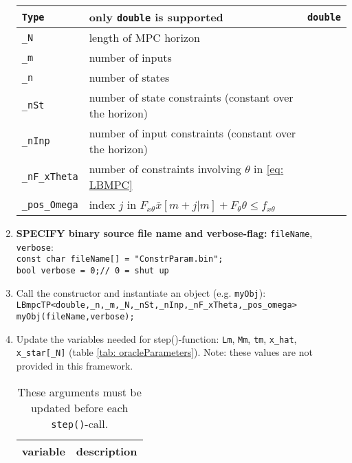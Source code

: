 \documentclass[letter]{article}
\begin{document}
\begin{sffamily}
\begin{enumerate}
\begin{table}[!htdp]
\begin{center}
\begin{tabular}{|l|l|l|}
			\texttt{Type} & only \texttt{double} is supported & \texttt{double} \\ \hline
 			\texttt{\_N} & length of MPC horizon & \\ \hline
 			\texttt{\_m} & number of inputs & \\ \hline
 			\texttt{\_n} & number of states & \\ \hline 
 			\texttt{\_nSt} & number of state constraints (constant over the horizon) & \\ \hline
 			\texttt{\_nInp} & number of input constraints (constant over the horizon) & \\ \hline
	 		\texttt{\_nF\_xTheta} & number of constraints involving $\theta$ in \eqref{eq: LBMPC} & \\ \hline
 			\texttt{\_pos\_Omega} & index $j$ in $F_{x\theta}\bar{x}[m+j|m] + F_\theta \theta \leq f_{x\theta}$ & \\ \hline 
		\end{tabular}
		\end{center}
		\label{tab: instantiateLBpmcTP}
		\end{table}	
	
	\item \textbf{SPECIFY binary source file name and verbose-flag:} \texttt{fileName}, \texttt{verbose}: \\
	\texttt{const char fileName[] = "ConstrParam.bin";} \\
	\texttt{bool verbose = 0;\qquad // 0 = shut up}
	
	\item Call the constructor and instantiate an object (e.g. \texttt{myObj}): \\
	\texttt{LBmpcTP<double,\_n,\_m,\_N,\_nSt,\_nInp,\_nF\_xTheta,\_pos\_omega> myObj(fileName,verbose);}
	
	\item Update the variables needed for step()-function: \texttt{Lm}, \texttt{Mm}, \texttt{tm},  \texttt{x\_hat}, \texttt{x\_star[\_N]}  (table 
\ref{tab: oracleParameters}). Note: these values are  not provided in this framework.
	
	\begin{table}[!htdp]
	\caption{These arguments must be updated before each \texttt{step()}-call.}
	\begin{center}
	\begin{tabular}{|l|l|}\hline
	{
 		\bf variable} & description \\ \hline\hline
 

\end{tabular}
\end{center}
\end{table}
\end{enumerate}
\end{sffamily}
\end{document}
